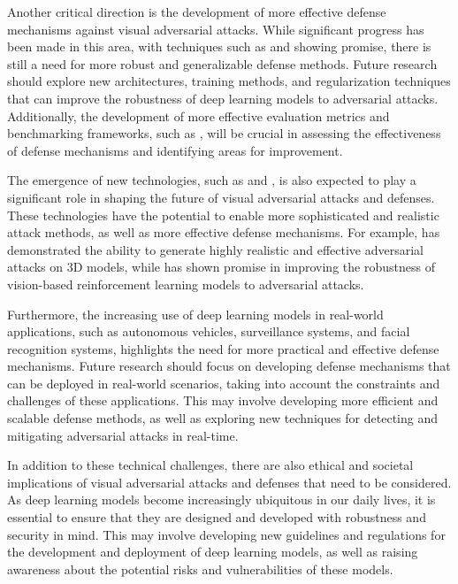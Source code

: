 \documentclass[11pt]{article}
\begin{document}
Another critical direction is the development of more effective defense mechanisms against visual adversarial attacks. While significant progress has been made in this area, with techniques such as \cite{ref111} and \cite{ref221} showing promise, there is still a need for more robust and generalizable defense methods. Future research should explore new architectures, training methods, and regularization techniques that can improve the robustness of deep learning models to adversarial attacks. Additionally, the development of more effective evaluation metrics and benchmarking frameworks, such as \cite{ref90}, will be crucial in assessing the effectiveness of defense mechanisms and identifying areas for improvement.

The emergence of new technologies, such as \cite{ref222} and \cite{ref152}, is also expected to play a significant role in shaping the future of visual adversarial attacks and defenses. These technologies have the potential to enable more sophisticated and realistic attack methods, as well as more effective defense mechanisms. For example, \cite{ref222} has demonstrated the ability to generate highly realistic and effective adversarial attacks on 3D models, while \cite{ref223} has shown promise in improving the robustness of vision-based reinforcement learning models to adversarial attacks.

Furthermore, the increasing use of deep learning models in real-world applications, such as autonomous vehicles, surveillance systems, and facial recognition systems, highlights the need for more practical and effective defense mechanisms. Future research should focus on developing defense mechanisms that can be deployed in real-world scenarios, taking into account the constraints and challenges of these applications. This may involve developing more efficient and scalable defense methods, as well as exploring new techniques for detecting and mitigating adversarial attacks in real-time.

In addition to these technical challenges, there are also ethical and societal implications of visual adversarial attacks and defenses that need to be considered. As deep learning models become increasingly ubiquitous in our daily lives, it is essential to ensure that they are designed and developed with robustness and security in mind. This may involve developing new guidelines and regulations for the development and deployment of deep learning models, as well as raising awareness about the potential risks and vulnerabilities of these models.
\end{document}
